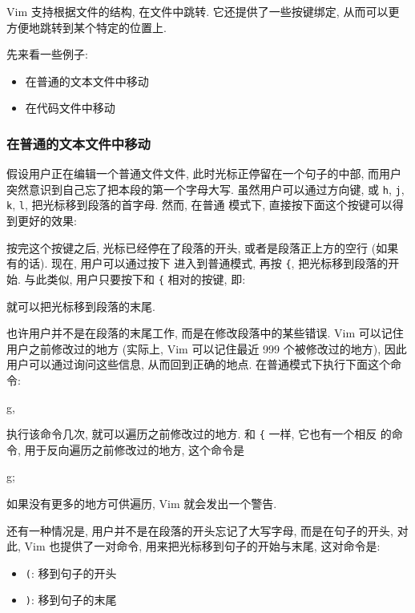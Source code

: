 Vim 支持根据文件的结构, 在文件中跳转. 它还提供了一些按键绑定, 从而可以更
方便地跳转到某个特定的位置上.

先来看一些例子:
\begin{itemize}
    \item 在普通的文本文件中移动
    \item 在代码文件中移动
\end{itemize}

\subsubsection{在普通的文本文件中移动}
\label{subsubsec:moving_around_within_a_text_file}

假设用户正在编辑一个普通文件文件, 此时光标正停留在一个句子的中部, 而用户
突然意识到自己忘了把本段的第一个字母大写. 虽然用户可以通过方向键, 或
\texttt{h}, \texttt{j}, \texttt{k}, \texttt{l}, 把光标移到段落的首字母. 然而, 在普通
模式下, 直接按下面这个按键可以得到更好的效果:
\begin{vimcode}
{
\end{vimcode}

按完这个按键之后, 光标已经停在了段落的开头, 或者是段落正上方的空行 (如果
有的话). 现在, 用户可以通过按下  进入到普通模式, 再按 \texttt{\{},
把光标移到段落的开始. 与此类似, 用户只要按下和 \texttt{\{} 相对的按键, 即:
\begin{vimcode}
}
\end{vimcode}
就可以把光标移到段落的末尾.

也许用户并不是在段落的末尾工作, 而是在修改段落中的某些错误. Vim 可以记住
用户之前修改过的地方 (实际上, Vim 可以记住最近 999 个被修改过的地方), 因此
用户可以通过询问这些信息, 从而回到正确的地点. 在普通模式下执行下面这个命令:
\begin{vimcode}
g,
\end{vimcode}
执行该命令几次, 就可以遍历之前修改过的地方. 和 \texttt{\{} 一样, 它也有一个相反
的命令, 用于反向遍历之前修改过的地方, 这个命令是
\begin{vimcode}
g;
\end{vimcode}
如果没有更多的地方可供遍历, Vim 就会发出一个警告.

还有一种情况是, 用户并不是在段落的开头忘记了大写字母, 而是在句子的开头, 对此,
Vim 也提供了一对命令, 用来把光标移到句子的开始与末尾, 这对命令是:
\begin{itemize}
    \item \texttt{(}: 移到句子的开头
    \item \texttt{)}: 移到句子的末尾
\end{itemize}

